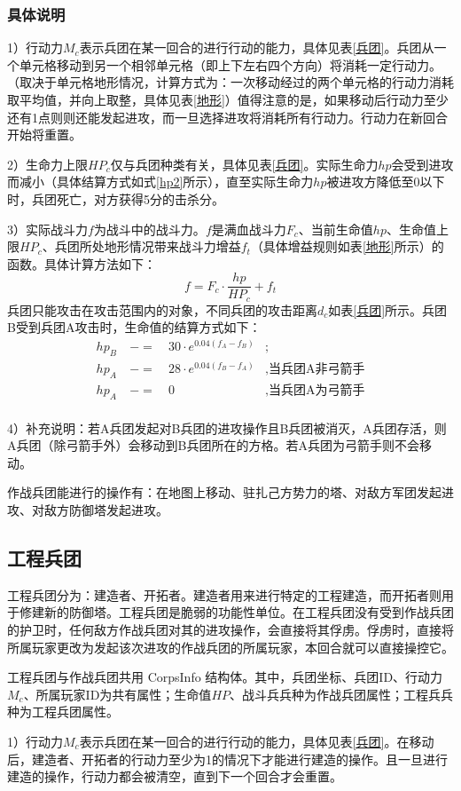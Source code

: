 \documentclass[a4paper,4pt]{article}
\begin{document}
\subsubsection{具体说明}
1）行动力$M_c$表示兵团在某一回合的进行行动的能力，具体见表\ref{兵团}。兵团从一个单元格移动到另一个相邻单元格（即上下左右四个方向）将消耗一定行动力。（取决于单元格地形情况，计算方式为：一次移动经过的两个单元格的行动力消耗取平均值，并向上取整，具体见表\ref{地形}）值得注意的是，如果移动后行动力至少还有1点则则还能发起进攻，而一旦选择进攻将消耗所有行动力。行动力在新回合开始将重置。\par
2）生命力上限$HP_c$仅与兵团种类有关，具体见表\ref{兵团}。实际生命力$hp$会受到进攻而减小（具体结算方式如式\ref{hp2}所示），直至实际生命力$hp$被进攻方降低至0以下时，兵团死亡，对方获得5分的击杀分。\par
3）实际战斗力$f$为战斗中的战斗力。$f$是满血战斗力$F_c$、当前生命值$hp$、生命值上限$HP_c$、兵团所处地形情况带来战斗力增益$f_t$（具体增益规则如表\ref{地形}所示）的函数。具体计算方法如下：
\begin{equation}
  f = F_c \cdot \frac{hp}{HP_c} + f_t\label{f2}
\end{equation}
兵团只能攻击在攻击范围内的对象，不同兵团的攻击距离$d_c$如表\ref{兵团}所示。兵团B受到兵团A攻击时，生命值的结算方式如下：
\begin{equation}
  \begin{aligned}
    hp_{B} & \ -= & \ 30 \cdot e^{0.04(f_{A}-f_{B})} & ;                        \\
    hp_{A} & \ -= & \ 28 \cdot e^{0.04(f_{B}-f_{A})} & , \text{当兵团A非弓箭手} \\
    hp_{A} & \ -= & \ 0                              & , \text{当兵团A为弓箭手} \\
  \end{aligned}
  \label{hp2}
\end{equation}\par
4）补充说明：若A兵团发起对B兵团的进攻操作且B兵团被消灭，A兵团存活，则A兵团（除弓箭手外）会移动到B兵团所在的方格。若A兵团为弓箭手则不会移动。

作战兵团能进行的操作有：在地图上移动、驻扎己方势力的塔、对敌方军团发起进攻、对敌方防御塔发起进攻。


\subsection{工程兵团}
工程兵团分为：建造者、开拓者。建造者用来进行特定的工程建造，而开拓者则用于修建新的防御塔。工程兵团是脆弱的功能性单位。在工程兵团没有受到作战兵团的护卫时，任何敌方作战兵团对其的进攻操作，会直接将其俘虏。俘虏时，直接将所属玩家更改为发起该次进攻的作战兵团的所属玩家，本回合就可以直接操控它。\par
工程兵团与作战兵团共用 CorpsInfo 结构体。其中，兵团坐标、兵团ID、行动力$M_c$、所属玩家ID为共有属性；生命值$HP$、战斗兵兵种为作战兵团属性；工程兵兵种为工程兵团属性。\par
1）行动力$M_c$表示兵团在某一回合的进行行动的能力，具体见表\ref{兵团}。在移动后，建造者、开拓者的行动力至少为1的情况下才能进行建造的操作。且一旦进行建造的操作，行动力都会被清空，直到下一个回合才会重置。\par
\end{document}
